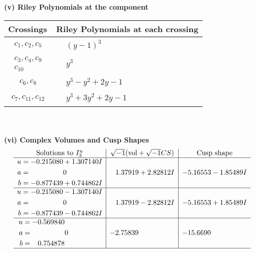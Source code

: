 \documentclass[1p]{elsarticle_modified}
\theoremstyle{definition}
\newcommand{\I}{\sqrt{-1}}
\begin{document}
\newpage\renewcommand{\arraystretch}{1}
\flushleft \textbf{(v) Riley Polynomials at the component}\newline \\
\begin{tabular}{m{50pt}|m{274pt}}
Crossings & \hspace{64pt}Riley Polynomials at each crossing \\
\hline $$\begin{aligned}c_{1},c_{2},c_{5}\end{aligned}$$&$\begin{aligned}
&(y-1)^3
\end{aligned}$\\
\hline $$\begin{aligned}c_{3},c_{4},c_{9}\\c_{10}\end{aligned}$$&$\begin{aligned}
&y^3
\end{aligned}$\\
\hline $$\begin{aligned}c_{6},c_{8}\end{aligned}$$&$\begin{aligned}
&y^3- y^2+2 y-1
\end{aligned}$\\
\hline $$\begin{aligned}c_{7},c_{11},c_{12}\end{aligned}$$&$\begin{aligned}
&y^3+3 y^2+2 y-1
\end{aligned}$\\
\hline
\end{tabular}\\~\\
\newpage\flushleft \textbf{(vi) Complex Volumes and Cusp Shapes}
$$\begin{array}{c|c|c}  
\text{Solutions to }I^u_{3}& \I (\text{vol} + \sqrt{-1}CS) & \text{Cusp shape}\\
 \hline 
\begin{aligned}
u &= -0.215080 + 1.307140 I \\
a &= \phantom{-0.000000 } 0 \\
b &= -0.877439 + 0.744862 I\end{aligned}
 & \phantom{-}1.37919 + 2.82812 I & -5.16553 - 1.85489 I \\ \hline\begin{aligned}
u &= -0.215080 - 1.307140 I \\
a &= \phantom{-0.000000 } 0 \\
b &= -0.877439 - 0.744862 I\end{aligned}
 & \phantom{-}1.37919 - 2.82812 I & -5.16553 + 1.85489 I \\ \hline\begin{aligned}
u &= -0.569840\phantom{ +0.000000I} \\
a &= \phantom{-0.000000 } 0 \\
b &= \phantom{-}0.754878\phantom{ +0.000000I}\end{aligned}
 & -2.75839\phantom{ +0.000000I} & -15.6690\phantom{ +0.000000I}\\
 \hline 
 \end{array}$$\newpage
\end{document}
